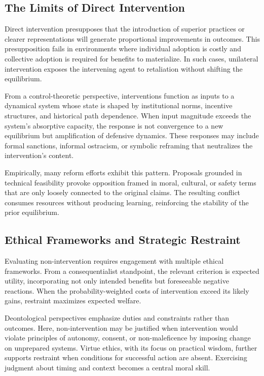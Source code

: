 \documentclass[11pt]{article}
\begin{document}
\subsection{The Limits of Direct Intervention}

Direct intervention presupposes that the introduction of superior practices or clearer representations will generate proportional improvements in outcomes. This presupposition fails in environments where individual adoption is costly and collective adoption is required for benefits to materialize. In such cases, unilateral intervention exposes the intervening agent to retaliation without shifting the equilibrium.

From a control-theoretic perspective, interventions function as inputs to a dynamical system whose state is shaped by institutional norms, incentive structures, and historical path dependence. When input magnitude exceeds the system’s absorptive capacity, the response is not convergence to a new equilibrium but amplification of defensive dynamics. These responses may include formal sanctions, informal ostracism, or symbolic reframing that neutralizes the intervention’s content.

Empirically, many reform efforts exhibit this pattern. Proposals grounded in technical feasibility provoke opposition framed in moral, cultural, or safety terms that are only loosely connected to the original claims. The resulting conflict consumes resources without producing learning, reinforcing the stability of the prior equilibrium.

\subsection{Ethical Frameworks and Strategic Restraint}

Evaluating non-intervention requires engagement with multiple ethical frameworks. From a consequentialist standpoint, the relevant criterion is expected utility, incorporating not only intended benefits but foreseeable negative reactions. When the probability-weighted costs of intervention exceed its likely gains, restraint maximizes expected welfare.

Deontological perspectives emphasize duties and constraints rather than outcomes. Here, non-intervention may be justified when intervention would violate principles of autonomy, consent, or non-maleficence by imposing change on unprepared systems. Virtue ethics, with its focus on practical wisdom, further supports restraint when conditions for successful action are absent. Exercising judgment about timing and context becomes a central moral skill.
\end{document}
